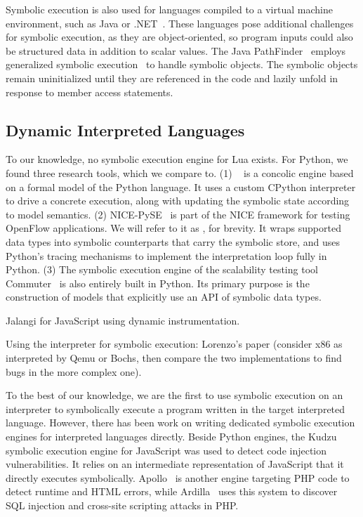 Symbolic execution is also used for languages compiled to a virtual machine environment, such as Java or .NET~\cite{jpf-symbex,tillmann-pex}.  These languages pose additional challenges for symbolic execution, as they are object-oriented, so program inputs could also be structured data in addition to scalar values.
%
The Java PathFinder~\cite{visser-jpf,jpf-symbex,jpf-testgen} employs generalized symbolic execution~\cite{generalized-symbex} to handle symbolic objects.  The symbolic objects remain uninitialized until they are referenced in the code and lazily unfold in response to member access statements.

\subsection{Dynamic Interpreted Languages}

To our knowledge, no symbolic execution engine for Lua exists.  For Python, we found three research tools, which we compare \chef to.  (1) \cutiepy~\cite{cutie-py} is a concolic engine based on a formal model of the Python language.  It uses a custom CPython interpreter to drive a concrete execution, along with updating the symbolic state according to model semantics. (2) NICE-PySE~\cite{nice} is part of the NICE framework for testing OpenFlow applications.  We will refer to it as \nicese, for brevity. It wraps supported data types into symbolic counterparts that carry the symbolic store, and uses Python's tracing mechanisms to implement the interpretation loop fully in Python.  (3) The symbolic execution engine of the scalability testing tool Commuter~\cite{commuter} is also entirely built in Python.  Its primary purpose is the construction of models that explicitly use an API of symbolic data types.

Jalangi for JavaScript using dynamic instrumentation.

Using the interpreter for symbolic execution: Lorenzo's paper (consider x86 as interpreted by Qemu or Bochs, then compare the two implementations to find bugs in the more complex one).

To the best of our knowledge, we are the first to use symbolic execution on an interpreter to symbolically execute a program written in the target interpreted language.  However, there has been work on writing dedicated symbolic execution engines for interpreted languages directly.  Beside Python engines, the Kudzu~\cite{saxena-kudzu} symbolic execution engine for JavaScript was used to detect code injection vulnerabilities. It relies on an intermediate representation of JavaScript that it directly executes symbolically.
%
Apollo~\cite{artzi-apollo} is another engine targeting PHP code to detect runtime and HTML errors, while Ardilla~\cite{kiezun-ardilla} uses this system to discover SQL injection and cross-site scripting attacks in PHP.


